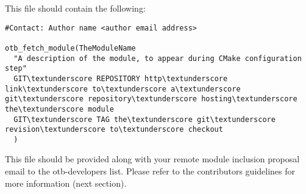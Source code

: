 This file should contain the following:

\begin{verbatim}
#Contact: Author name <author email address>

otb_fetch_module(TheModuleName
  "A description of the module, to appear during CMake configuration step"
  GIT\textunderscore REPOSITORY http\textunderscore link\textunderscore to\textunderscore a\textunderscore git\textunderscore repository\textunderscore hosting\textunderscore the\textunderscore module
  GIT\textunderscore TAG the\textunderscore git\textunderscore revision\textunderscore to\textunderscore checkout
  )
\end{verbatim}
This file should be provided along with your remote module inclusion proposal email to the otb-developers list. Please refer to the contributors guidelines for more information (next section).

